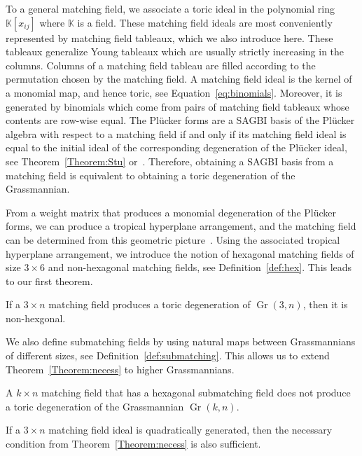 \documentclass[ALCO,ThmDefs,Unicode,epreuves]{cedram}
\DeclareMathOperator{\Gr}{Gr}
\begin{document}
To a general matching field, we associate a toric ideal in the polynomial ring $\mathbb{K}[x_{ij}]$ where $\mathbb{K}$ is a field. These matching field ideals are most conveniently represented by matching field tableaux, which we also introduce here. These tableaux generalize Young tableaux which are usually strictly increasing in the columns. Columns of a matching field tableau are filled according to the permutation chosen by the matching field. 
A matching field ideal is the kernel of a monomial map, and hence toric, see Equation~\eqref{eq:binomials}. Moreover, it is generated by binomials which come from pairs of matching field tableaux whose contents are row-wise equal. 
The Pl{\"u}cker forms are a SAGBI basis of the Pl{\"u}cker algebra with respect to a matching field if and only if its matching field ideal is equal to the initial ideal of the corresponding degeneration of the Pl{\"u}cker ideal, see Theorem~\ref{Theorem:Stu} or~\cite[Theorem~11.4]{sturmfels1996grobner}. Therefore, obtaining a SAGBI basis from a matching field is equivalent to obtaining a toric degeneration of the Grassmannian. 
 
From a weight matrix that produces a monomial degeneration of the Pl{\"u}cker forms, we can produce a tropical hyperplane arrangement, and the matching field can be determined from this geometric picture~\cite{fink2015stiefel}.
Using the associated tropical hyperplane arrangement, we introduce the notion of hexagonal matching fields of size $3 \times 6$ and non-hexagonal matching fields, see Definition~\ref{def:hex}. This leads to our first theorem. 

\begin{theo}\label{Theorem:necess}
If a $3 \times n$ matching field produces a toric degeneration of $\Gr(3,n)$, then it is non-hexgonal. 
\end{theo}

We also define submatching fields by using natural maps between Grassmannians of different sizes, see Definition~\ref{def:submatching}.
This allows us to extend Theorem~\ref{Theorem:necess} to higher Grassmannians. 
\begin{theo}\label{Theorem:subhex}
A $k \times n$ matching field that has a hexagonal submatching field does not produce a toric degeneration of the Grassmannian $\Gr(k, n)$. 
\end{theo}


If a $3 \times n$ matching field ideal is quadratically generated, then the necessary condition from Theorem~\ref{Theorem:necess} is also sufficient. 
\end{document}
